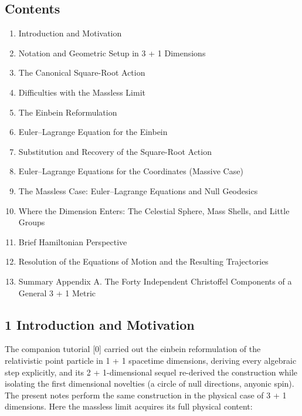 \documentclass[
]{article}
\providecommand{\tightlist}{%
  \setlength{\itemsep}{0pt}\setlength{\parskip}{0pt}}
\begin{document}
\hypertarget{contents}{%
\subsection{Contents}\label{contents}}

\begin{enumerate}
\def\labelenumi{\arabic{enumi}.}
\tightlist
\item
  Introduction and Motivation
\item
  Notation and Geometric Setup in 3 + 1 Dimensions
\item
  The Canonical Square-Root Action
\item
  Difficulties with the Massless Limit
\item
  The Einbein Reformulation
\item
  Euler--Lagrange Equation for the Einbein
\item
  Substitution and Recovery of the Square-Root Action
\item
  Euler--Lagrange Equations for the Coordinates (Massive Case)
\item
  The Massless Case: Euler--Lagrange Equations and Null Geodesics
\item
  Where the Dimension Enters: The Celestial Sphere, Mass Shells, and
  Little Groups
\item
  Brief Hamiltonian Perspective
\item
  Resolution of the Equations of Motion and the Resulting Trajectories
\item
  Summary Appendix A. The Forty Independent Christoffel Components of a
  General 3 + 1 Metric
\end{enumerate}

\hypertarget{introduction-and-motivation}{%
\subsection{1 Introduction and
Motivation}\label{introduction-and-motivation}}

The companion tutorial {[}0{]} carried out the einbein reformulation of
the relativistic point particle in 1 + 1 spacetime dimensions, deriving
every algebraic step explicitly, and its 2 + 1-dimensional sequel
re-derived the construction while isolating the first dimensional
novelties (a circle of null directions, anyonic spin). The present notes
perform the same construction in the physical case of 3 + 1 dimensions.
Here the massless limit acquires its full physical content:
\end{document}
